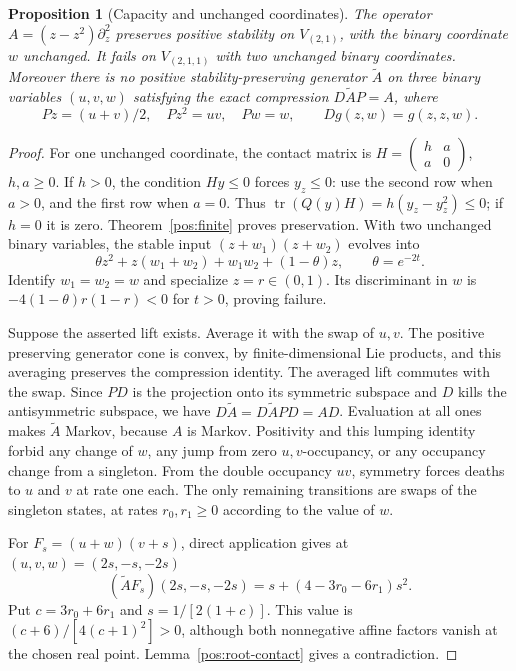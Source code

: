 \documentclass[reqno]{amsart}
\newtheorem{proposition}[theorem]{Proposition}
\theoremstyle{definition}
\theoremstyle{remark}
\begin{document}
\begin{proposition}[Capacity and unchanged coordinates]\label{pos:spectators}
The operator \(A=(z-z^2)\partial_z^2\) preserves positive stability on
\(V_{(2,1)}\), with the binary coordinate \(w\) unchanged.
It fails on \(V_{(2,1,1)}\) with two unchanged binary coordinates.
Moreover there is no positive stability-preserving generator \(\widetilde A\)
on three binary variables \((u,v,w)\) satisfying the exact compression
\(D\widetilde A P=A\), where
\[
 Pz=(u+v)/2,\quad Pz^2=uv,\quad Pw=w,
 \qquad Dg(z,w)=g(z,z,w).
\]
\end{proposition}
\begin{proof}
For one unchanged coordinate, the contact matrix is
\(H=\left(\begin{smallmatrix}h&a\\a&0\end{smallmatrix}\right)\), \(h,a\ge0\).
If \(h>0\), the condition \(Hy\le0\) forces \(y_z\le0\): use the second
row when \(a>0\), and the first row when \(a=0\).
Thus \(\operatorname{tr}(Q(y)H)=h(y_z-y_z^2)\le0\); if \(h=0\) it is zero.
Theorem~\ref{pos:finite} proves preservation.
With two unchanged binary variables, the stable input
\((z+w_1)(z+w_2)\) evolves into
\[
 \theta z^2+z(w_1+w_2)+w_1w_2+(1-\theta)z,
 \qquad\theta=e^{-2t}.
\]
Identify \(w_1=w_2=w\) and specialize \(z=r\in(0,1)\).
Its discriminant in \(w\) is
\(-4(1-\theta)r(1-r)<0\) for \(t>0\), proving failure.

Suppose the asserted lift exists.  Average it with the swap of \(u,v\).
The positive preserving generator cone is convex, by finite-dimensional Lie
products, and this averaging preserves the compression identity.
The averaged lift commutes with the swap.  Since \(PD\) is the projection onto
its symmetric subspace and \(D\) kills the antisymmetric subspace, we have
\(D\widetilde A=D\widetilde A PD=AD\).
Evaluation at all ones makes \(\widetilde A\) Markov, because \(A\) is Markov.
Positivity and this lumping identity forbid any change of \(w\), any jump from
zero \(u,v\)-occupancy, or any occupancy change from a singleton.
From the double occupancy \(uv\), symmetry forces deaths to \(u\) and \(v\)
at rate one each.  The only remaining transitions are swaps of the singleton
states, at rates \(r_0,r_1\ge0\) according to the value of \(w\).

For \(F_s=(u+w)(v+s)\), direct application gives at
\((u,v,w)=(2s,-s,-2s)\)
\[
 (\widetilde A F_s)(2s,-s,-2s)
 =s+(4-3r_0-6r_1)s^2.
\]
Put \(c=3r_0+6r_1\) and \(s=1/[2(1+c)]\).  This value is
\((c+6)/[4(c+1)^2]>0\), although both nonnegative affine factors vanish at
the chosen real point.  Lemma~\ref{pos:root-contact} gives a contradiction.
\end{proof}
\end{document}

